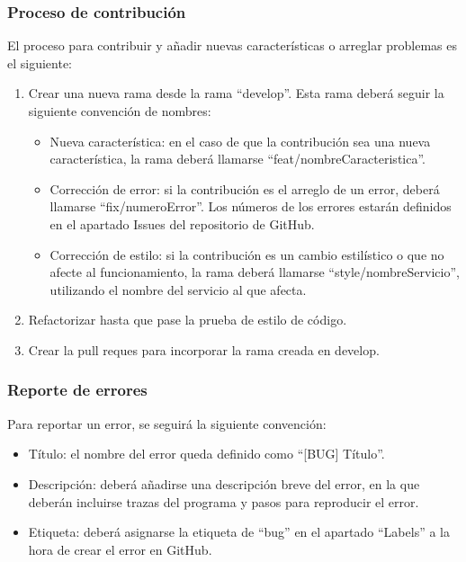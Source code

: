 \subsubsection{Proceso de contribución}
El proceso para contribuir y añadir nuevas características o arreglar problemas es el siguiente:
\begin{enumerate}
    \item Crear una nueva rama desde la rama ``develop''. Esta rama deberá seguir la siguiente convención de 
        nombres:
        \begin{itemize}
            \item Nueva característica: en el caso de que la contribución sea una nueva característica,
                la rama deberá llamarse ``feat/nombreCaracteristica''.
            \item Corrección de error: si la contribución es el arreglo de un error, deberá llamarse ``fix/numeroError''.
                Los números de los errores estarán definidos en el apartado Issues del repositorio de GitHub.
            \item Corrección de estilo: si la contribución es un cambio estilístico o que 
                no afecte al funcionamiento, la rama deberá llamarse ``style/nombreServicio'', utilizando el nombre 
                del servicio al que afecta.
        \end{itemize}
    \item Refactorizar hasta que pase la prueba de estilo de código.
    \item Crear la pull reques para incorporar la rama creada en develop.
\end{enumerate}

\subsubsection{Reporte de errores}
Para reportar un error, se seguirá la siguiente convención:
\begin{itemize}
    \item Título: el nombre del error queda definido como ``[BUG] Título''.
    \item Descripción: deberá añadirse una descripción breve del error, en la que deberán incluirse trazas del 
        programa y pasos para reproducir el error.
    \item Etiqueta: deberá asignarse la etiqueta de ``bug'' en el apartado ``Labels'' a la hora de crear el 
        error en GitHub.
\end{itemize}

